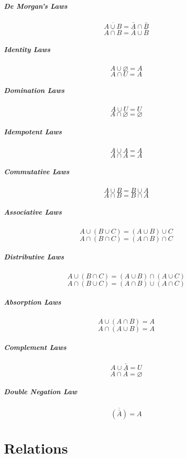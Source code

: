 \documentclass[a4paper, 10pt]{article}
\begin{document}
\begin{multicols}{2}
    \subparagraph{De Morgan's Laws}
    \[ \overline{A\cup B} = \bar{A}\cap\bar{B} \]
    \[ \overline{A\cap B} = \bar{A}\cup\bar{B} \]

    \subparagraph{Identity Laws}
    \[ A\cup\varnothing = A \]
    \[ A\cap U = A \]

    \subparagraph{Domination Laws}
    \[ A\cup U = U \]
    \[ A\cap\varnothing = \varnothing \]

    \subparagraph{Idempotent Laws}
    \[ A\cup A = A \]
    \[ A\cap A = A \]

    \subparagraph{Commutative Laws}
    \[ A\cup B = B\cup A \]
    \[ A\cap B = B\cap A \]

    \subparagraph{Associative Laws}
    \[ A\cup(B\cup C) = (A\cup B)\cup C \]
    \[ A\cap(B\cap C) = (A\cap B)\cap C \]

    \subparagraph{Distributive Laws}
    \[ A\cup(B\cap C) = (A\cup B)\cap (A\cup C) \]
    \[ A\cap(B\cup C) = (A\cap B)\cup (A\cap C) \]

    \subparagraph{Absorption Laws}
    \[ A\cup(A\cap B) = A \]
    \[ A\cap(A\cup B) = A \]

    \subparagraph{Complement Laws}
    \[ A\cup\bar{A} = U \]
    \[ A\cap\bar{A} = \varnothing \]

    \subparagraph{Double Negation Law}
    \[ \overline{\left(\bar{A}\right)} = A \]
\end{multicols}

\newpage
\section{Relations}
\end{document}
